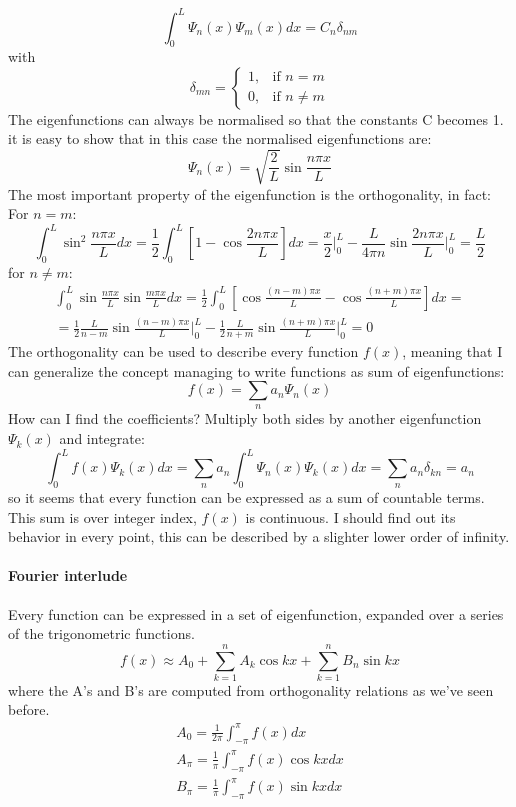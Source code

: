 \begin{equation}
    \int_0^L\Psi_n(x)\Psi_m(x)dx=C_n\delta_{nm}
\end{equation}
with $$\delta_{mn}=\begin{cases}
    1 , &\text{if $n=m$}\\
    0, &\text{if $n\ne m$}
\end{cases}$$
The eigenfunctions can always be normalised so that the constants C becomes 1. it is easy to show that in this case the normalised eigenfunctions are:
\begin{equation}
    \Psi_n(x)=\sqrt{\frac{2}{L}}\sin\frac{n\pi x}{L}
\end{equation}
The most important property of the eigenfunction is the
orthogonality, in fact:
For $n=m$: 
$$\int_0^L\sin^2\frac{n\pi x}{L}dx=\frac{1}{2}\int_0^L\left[1-\cos\frac{2n\pi x}{L}\right]dx=\frac{x}{2}\bigg|_0^L-\frac{L}{4\pi n}\sin\frac{2n\pi x}{L}\bigg|_0^L=\frac{L}{2}$$
for $n\ne m$:
\begin{equation*}
    \begin{split}
     \int_0^L\sin\frac{n\pi x}{L}\sin\frac{m\pi x}{L}dx=\frac{1}{2}\int_0^L\left[\cos\frac{(n-m)\pi x}{L}-\cos\frac{(n+m)\pi x}{L}\right]dx= \\
     =\frac{1}{2}\frac{L}{n-m}\sin\frac{(n-m)\pi x}{L}\bigg|_0^L-\frac{1}{2}\frac{L}{n+m}\sin\frac{(n+m)\pi x}{L}\bigg|_0^L=0
    \end{split}
\end{equation*}
The orthogonality can be used to describe every function $f(x)$, meaning that I can generalize the concept managing to write functions as sum of eigenfunctions:
$$f(x)=\displaystyle\sum_na_n\Psi_n(x)$$
How can I find the coefficients? Multiply both sides by another
eigenfunction $\Psi_k(x)$ and integrate:
$$\int_0^Lf(x)\Psi_k(x)dx=\displaystyle\sum_na_n\int_0^L\Psi_n(x)\Psi_k(x)dx=\displaystyle\sum_na_n\delta_{kn}=a_n$$
so it seems that every function can be expressed as a sum of countable terms. This sum is over integer index, $f(x)$ is continuous. I should find out its behavior in every point, this can be described by a slighter lower order of infinity. 
\paragraph{Fourier interlude} Every function can be expressed in a set of eigenfunction, expanded over a series of the trigonometric functions. 
\begin{equation}
    f(x)\approx A_0+\displaystyle\sum_{k=1}^nA_k\cos kx+\sum_{k=1}^nB_n\sin kx
\end{equation}
where the A's and B's are computed from orthogonality relations as we've seen before.
\begin{align*}
    A_0=\frac{1}{2\pi}\int_{-\pi}^{\pi}f(x)dx\\
    A_{\pi}=\frac{1}{\pi}\int_{-\pi}^{\pi}f(x)\cos kxdx \\
    B_{\pi}=\frac{1}{\pi}\int_{-\pi}^{\pi} f(x)\sin kx dx 
\end{align*}

